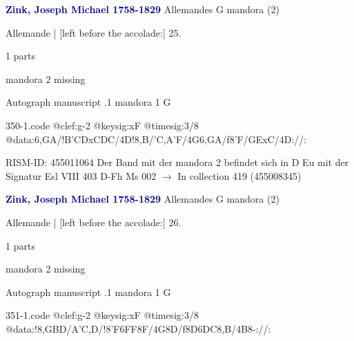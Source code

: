 \documentclass[twocolumn]{book}
\begin{document}
\newline \par \vspace{7pt} \textcolor{darkblue}{\textbf{Zink, Joseph Michael  1758-1829}}
\newline Allemandes  G  
\newline mandora (2)
\newline \begin{itshape}[f.16v, at left:] Allemande | [left before the accolade:] 25.\end{itshape} 
\newline \textcolor{darkblue}{}  1 parts  
\newline \begin{small} mandora 2 missing\end{small} 
\newline Autograph manuscript
.1  mandora 1  G  
\begin{filecontents*}{350-1.code}
@clef:g-2
@keysig:xF
@timesig:3/8
@data:{6,GA}/!{B'CD}{xCDC}/4D!8,B/'C,A'F/4G{6,GA}/f8'F/GExC/4D://:
\end{filecontents*}
\newline
%

\newline RISM-ID: 455011064
\newline Der Band mit der mandora 2 befindet sich in D Eu mit der Signatur Esl VIII 403
\newline D-Fh  Ms 002
\newline $\rightarrow$ In collection 419 (455008345)

\newline \par \vspace{7pt} \textcolor{darkblue}{\textbf{Zink, Joseph Michael  1758-1829}}
\newline Allemandes  G  
\newline mandora (2)
\newline \begin{itshape}[f.16v, at left:] Allemande | [left before the accolade:] 26.\end{itshape} 
\newline \textcolor{darkblue}{}  1 parts  
\newline \begin{small} mandora 2 missing\end{small} 
\newline Autograph manuscript
.1  mandora 1  G  
\begin{filecontents*}{351-1.code}
@clef:g-2
@keysig:xF
@timesig:3/8
@data:!8,GBD/A'C,D/!{8'F6FF8F}/4G8D/f{8D6DC8,B}/4B8-://:
\end{filecontents*}
\newline
%
\end{document}
